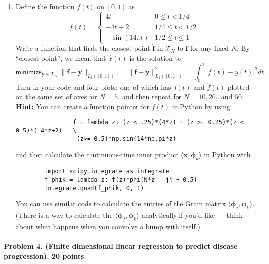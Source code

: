 \documentclass[11pt,twoside]{article}
\begin{document}
\begin{enumerate}[label=(\alph*)]
        \item Define the function $f(t)$ on $[0,1]$ as
        \[
                f(t) = 
                \begin{cases} 
                        4t & 0\leq t < 1/4 \\
                        -4t+2 & 1/4\leq t < 1/2 \\
                        -\sin(14\pi t) & 1/2\leq t\leq 1\end{cases}.
        \]
        Write a function that finds the closest point $\hat{\mathbf{f}}$ in $\mathcal{T}_N$ to $\mathbf{f}$ for any fixed $N$.  By ``closest point'', we mean that $\hat{x}(t)$ is the solution to
        \[
                \mathsf{minimize}_{\mathbf{y}\in\mathcal{T}_N}~\|\mathbf{f} - \mathbf{y}\|_{L_2([0,1])},
                \quad\|\mathbf{f} - \mathbf{y}\|_{L_2([0,1])}^2 =  \int_{0}^1|f(t)-y(t)|^2 dt.
        \]
        Turn in your code and four plots; one of which has $f(t)$ and $\hat{f}(t)$ plotted on the same set of axes for $N=5$, and then repeat for $N=10,20,$ and $50$. \\
        {\bf Hint:} You can create a function pointer for $f(t)$ in Python by using 
        \begin{verbatim}
                f = lambda z: (z < .25)*(4*z) + (z >= 0.25)*(z < 0.5)*(-4*z+2) - \
                 (z>= 0.5)*np.sin(14*np.pi*z)
        \end{verbatim}  
        and then calculate the continuous-time inner product $\langle \mathbf{x},\mathbf{\phi}_k\rangle$ in Python with 
        \begin{verbatim}
        import scipy.integrate as integrate
        f_phik = lambda z: f(z)*phi(N*z - jj + 0.5)
        integrate.quad(f_phik, 0, 1)
        \end{verbatim}
        You can use similar code to calculate the entries of the Gram matrix $\langle\mathbf{\phi}_j,\mathbf{\phi}_k\rangle$.  (There is  a way to calculate the $\langle \mathbf{\phi}_j,\mathbf{\phi}_k\rangle$ analytically if you'd like --- think about what happens when you convolve a bump with itself.)
\end{enumerate}

\paragraph{Problem 4. (Finite dimensional linear regression to predict disease progression). 20 points}
\end{document}
